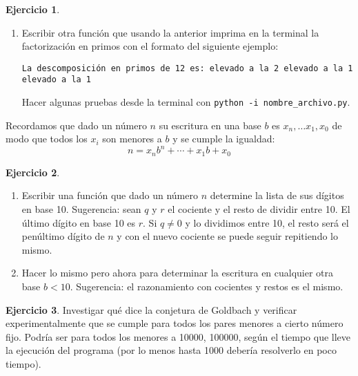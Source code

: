 \documentclass[a4paper,12pt]{book}
\theoremstyle{definition}
\newtheorem{ejercicio}{Ejercicio}
\begin{document}
\begin{ejercicio}
\begin{enumerate}
			Sugerencia: recordar el ejercicio \ref{ejer-2}.
			
			\item Escribir otra función que usando la anterior imprima en la terminal la factorización en primos con el formato del siguiente ejemplo:
	
				{\tt La descomposición en primos de 12 es:
				 elevado a la 2
				 elevado a la 1
				 elevado a la 1}
				
				
			Hacer algunas pruebas desde la terminal con {\tt python -i nombre\_archivo.py}.
		\end{enumerate}
	\end{ejercicio}
	
	Recordamos que dado un número $n$ su escritura en una base $b$ es $x_n,\dots x_1,x_0$ de modo que todos los $x_i$ son menores a $b$ y se cumple la igualdad:
	$$n = x_nb^n+\cdots+x_1b+x_0
	$$
	
	\begin{ejercicio}
		\begin{enumerate}
			\item Escribir una función que dado un número $n$ determine la lista de sus dígitos en base 10. Sugerencia: sean $q$ y $r$ el cociente y el resto de dividir entre 10. El último dígito en base 10 es $r$. Si $q\not=0$ y lo dividimos entre 10, el resto será el penúltimo dígito de $n$ y con el nuevo cociente se puede seguir repitiendo lo mismo.
			
			\item Hacer lo mismo pero ahora para determinar la escritura en cualquier otra base $b<10$. Sugerencia: el razonamiento con cocientes y  restos es el mismo.
		\end{enumerate}
	\end{ejercicio}
	
	\begin{ejercicio}
		Investigar qué dice la conjetura de Goldbach y verificar experimentalmente que se cumple para todos los pares menores a cierto número fijo. Podría ser para todos los menores a 10000, 100000, según el tiempo que lleve la ejecución del programa (por lo menos hasta 1000 debería resolverlo en poco tiempo).
	\end{ejercicio}
	
\end{document}
